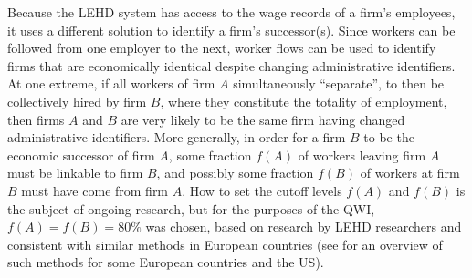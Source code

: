 Because the LEHD system has access to the wage records of a firm's
employees, it uses a different solution to identify a firm's
successor(s). Since workers can be followed from one employer to the next,
worker flows can be used to identify firms that are economically identical
despite changing administrative identifiers. At one extreme, if all workers
of firm $A$ simultaneously ``separate'', to then be collectively hired
by firm $B$, where they constitute the totality of employment, then
firms $A$ and $B$ are very likely to be the same firm having
changed administrative identifiers. More generally, in order for a firm
$B$ to be the economic successor of firm $A$, some fraction $f(A)$ of
workers leaving firm $A$ must be linkable to firm $B$, and possibly some
fraction $f(B)$ of workers at firm $B$ must have come from firm $A$. How to
set the cutoff levels $f(A)$ and $f(B)$ is the subject of ongoing research,
but for the purposes of the QWI, $f(A)=f(B)=80\%$ was chosen, based on
research by LEHD researchers \citep{tp-2003-09} and consistent
with similar methods in European countries (see \citet{Vilhuber2004} for an
overview of such methods for some European countries and the US).


